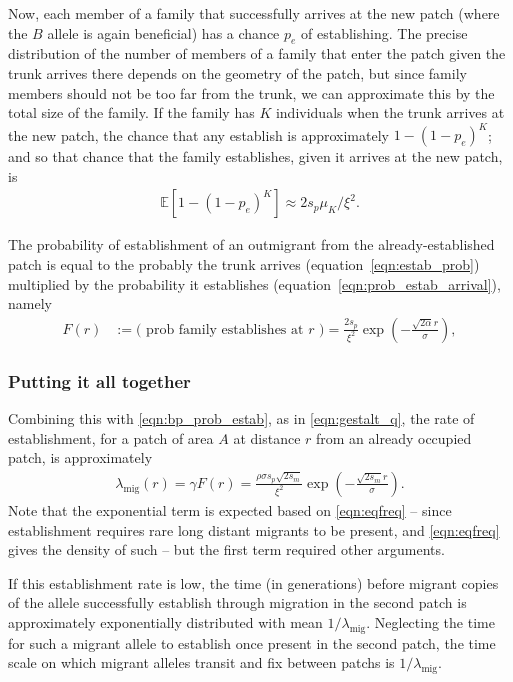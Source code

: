 \documentclass{article}
\newcommand{\E}{\mathbb{E}}
\newcommand{\migrate}{\lambda_\text{mig}}
\begin{document}
Now, each member of a family that successfully arrives at the new patch
(where the $B$ allele is again beneficial)
has a chance $p_e$ of establishing.
The precise distribution of the number of members of a family that enter the patch
given the trunk arrives there
depends on the geometry of the patch,
but since family members should not be too far from the trunk,
we can approximate this by the total size of the family.
If the family has $K$ individuals when the trunk arrives at the new patch,
the chance that any establish is approximately $1-(1-p_e)^K$;
and so that chance that the family establishes, given it arrives at the new patch, 
is 
\begin{align}
    \label{eqn:prob_estab_arrival}
    \E[1-(1-p_e)^K] \approx 2 s_p \mu_K/\xi^2 .
\end{align}

The probability of establishment of an outmigrant from the already-established patch is 
equal to the probably the trunk arrives (equation~\eqref{eqn:estab_prob}) multiplied by the probability it establishes (equation~\eqref{eqn:prob_estab_arrival}),
namely
\begin{align} \label{eqn:bp_prob_estab}
    F(r) &:= \text{( prob family establishes at $r$ )} = \frac{2s_p}{\xi^2} \exp\left( - \frac{\sqrt{2 \alpha} r}{\sigma} \right) ,
\end{align}



\subsubsection*{Putting it all together}

Combining this with \eqref{eqn:bp_prob_estab}, as in \eqref{eqn:gestalt_q}, 
the rate of establishment, for a patch of area $A$ at distance $r$ from an already occupied patch, is approximately
\begin{align} \label{eqn:migrate}
    \migrate(r) = \gamma F(r) = \frac{\rho \sigma s_p\sqrt{2s_m} }{\xi^2}  \exp\left( -\frac{ \sqrt{2 s_m} r}{\sigma} \right).
\end{align}
Note that the exponential term is expected based on \eqref{eqn:eqfreq} -- 
since establishment requires rare long distant migrants to be present, and \eqref{eqn:eqfreq} gives the density of such --
but the first term required other arguments.

If this establishment rate is low, 
the time (in generations) before migrant copies of the allele successfully establish through migration in the second patch
is approximately exponentially distributed with mean $1/\migrate$.
Neglecting the time for such a migrant allele to establish once present in the second patch,
the time scale on which migrant alleles transit and fix between patchs is $1/\migrate$.
\end{document}
